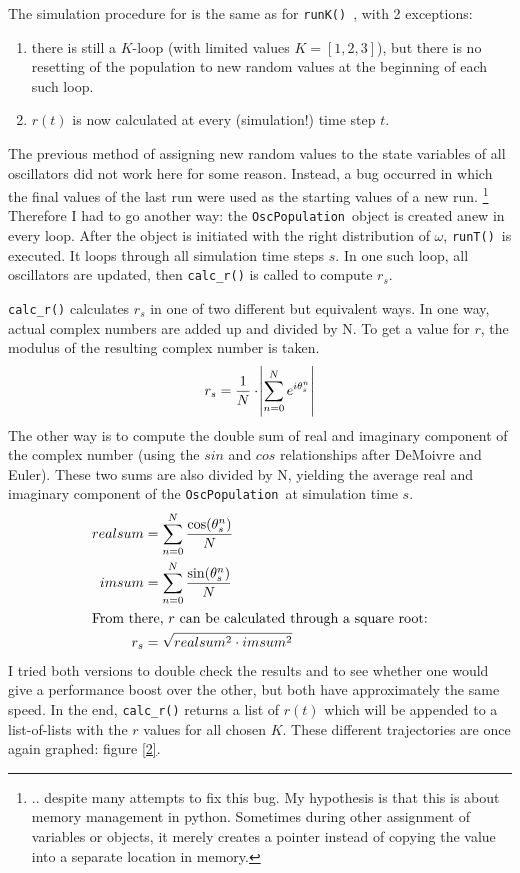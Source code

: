 \documentclass[11pt,a4paper]{article}
\newcommand{\oscpop}{\texttt{OscPopulation}~}
\newcommand{\runK}{\code{runK()}~}
\newcommand{\runT}{\code{runT()}~}
\newcommand{\code}[1]{\texttt{#1}}
\begin{document}
The simulation procedure for is the same as for \runK, with 2 exceptions:
\begin{enumerate}
	\item there is still a $K$-loop (with limited values $K = [1,2,3]$), but there is no resetting of the population to new random values at the beginning of each such loop.
	\item $r(t)$ is now calculated at every (simulation!) time step $t$.
\end{enumerate}
The previous method of assigning new random values to the state variables of all oscillators did not work here for some reason. 
Instead, a bug occurred in which the final values of the last run were used as the starting values of a new run.%
	\footnote{.. despite many attempts to fix this bug. My hypothesis is that this is about memory management in python. Sometimes during other assignment of variables or objects, it merely creates a pointer instead of copying the value into a separate location in memory.}
Therefore I had to go another way: the \oscpop object is created anew in every loop. 
After the object is initiated with the right distribution of $\omega$, \runT is executed. 
It loops through all simulation time steps $s$. 
In one such loop, all oscillators are updated, then \code{calc\_r()} is called to compute $r_s$.

\code{calc\_r()} calculates $r_s$ in one of two different but equivalent ways. 
In one way, actual complex numbers are added up and divided by N. 
To get a value for $r$, the modulus of the resulting complex number is taken. 
$$ r_s = \frac{1}{N}       \cdot       \abs{\sum_{n=0}^N e^{ i \theta^n_s}}$$
The other way is to compute the double sum of real and imaginary component of the complex number (using the $sin$ and $cos$ relationships after DeMoivre and Euler).
These two sums are also divided by N, yielding the average real and imaginary component of the \oscpop at simulation time $s$. 
\begin{align*}
	realsum 	&= \sum_{n=0}^N \frac{\cos(\theta^n_s)}{N} \\
	imsum 		&= \sum_{n=0}^N \frac{\sin(\theta^n_s)}{N} \\
\intertext{From there, $r$ can be calculated through a square root:}
	r_s			&= \sqrt{realsum^2 \cdot imsum^2}
\end{align*}
I tried both versions to double check the results and to see whether one would give a performance boost over the other, but both have approximately the same speed.
In the end, \code{calc\_r()} returns a list of $r(t)$ which will be appended to a list-of-lists with the $r$ values for all chosen $K$. 
These different trajectories are once again graphed: figure \ref{2}.
\end{document}
